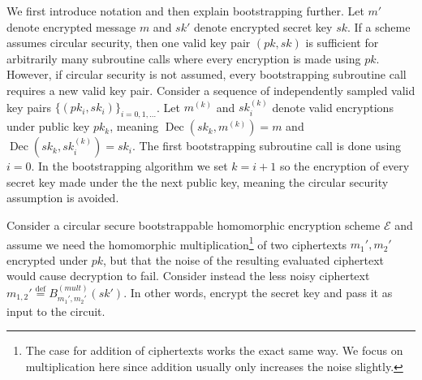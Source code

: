 We first introduce notation and then explain bootstrapping further. Let $m'$ denote encrypted message $m$ and $sk'$ denote encrypted secret key $sk$. If a scheme assumes circular security, then one valid key pair $(pk,sk)$ is sufficient for arbitrarily many subroutine calls where every encryption is made using $pk$. However, if circular security is not assumed, every bootstrapping subroutine call requires a new valid key pair. Consider a sequence of independently sampled valid key pairs $\{(pk_i,sk_i)\}_{i = 0, 1, \dots}$. Let $m^{(k)}$ and $sk_i^{(k)}$ denote valid encryptions under public key $pk_k$, meaning $\operatorname{Dec}(sk_k,m^{(k)}) = m$ and $\operatorname{Dec}(sk_k,sk_i^{(k)}) = sk_i$. The first bootstrapping subroutine call is done using $i = 0$. In the bootstrapping algorithm we set $k = i+1$ so the encryption of every secret key made under the the next public key, meaning the circular security assumption is avoided. 


Consider a circular secure bootstrappable homomorphic encryption scheme $\mathcal{E}$ and assume we need the homomorphic multiplication\footnote{The case for addition of ciphertexts works the exact same way. We focus on multiplication here since addition usually only increases the noise slightly.} of two ciphertexts $m_1', m_2'$ encrypted under $pk$, but that the noise of the resulting evaluated ciphertext would cause decryption to fail. Consider instead the less noisy ciphertext $m_{1,2}' \stackrel{\mathrm{def}}{=} B_{m_1',m_2'}^{(mult)}(sk')$. In other words, encrypt the secret key and pass it as input to the circuit.

